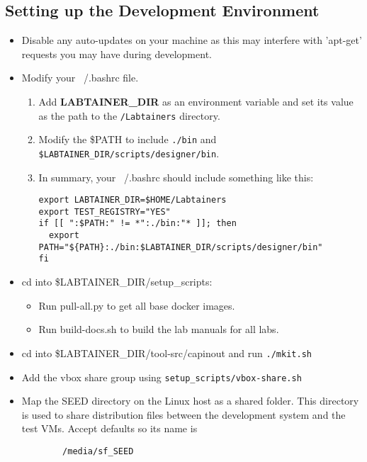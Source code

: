 \documentclass[12pt]{article}
\begin{document}
\subsection{Setting up the Development Environment}
\begin {itemize}
\item Disable any auto-updates on your machine as this may interfere with 'apt-get' requests you may have during development.
\item Modify your ~/.bashrc file.
    \begin{enumerate}
    \item Add {\bf LABTAINER\_DIR} as an environment variable and set its value as the path to the {\tt  /Labtainers} directory. 
    \item Modify the \$PATH to include {\tt ./bin} and {\tt \$LABTAINER\_DIR/scripts/designer/bin}.
    \item In summary, your ~/.bashrc should include something like this:
	    \lstset{basicstyle=\footnotesize\ttfamily,
		    breaklines=true
	    	    framextopmargin=50pt
		    frame=single,
		    language=bash}
	    \begin{mdframed}
	    \begin{lstlisting}
export LABTAINER_DIR=$HOME/Labtainers
export TEST_REGISTRY="YES"
if [[ ":$PATH:" != *":./bin:"* ]]; then
  export PATH="${PATH}:./bin:$LABTAINER_DIR/scripts/designer/bin"
fi
	    \end{lstlisting}
	    \end{mdframed}
    \end{enumerate}
\item cd into \$LABTAINER\_DIR/setup\_scripts:
    \begin{itemize}
   	\item Run pull-all.py to get all base docker images.
    	\item Run build-docs.sh to build the lab manuals for all labs.
    \end{itemize}
\item cd into \$LABTAINER\_DIR/tool-src/capinout and run {\tt ./mkit.sh}
\item Add the vbox share group using {\tt setup\_scripts/vbox-share.sh} 
\item Map the SEED directory on the Linux host as a shared folder. This directory is used
to share distribution files between the development system and the test VMs.  Accept defaults so its name is 
\begin{verbatim}
        /media/sf_SEED
\end{verbatim}
\end {itemize}
\end{document}
